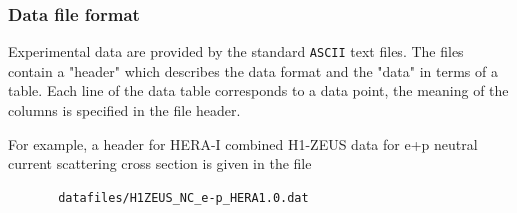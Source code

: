 \subsubsection{Data file format}
\label{sec:dataformat}
   Experimental data are provided by the standard {\tt ASCII} text files. The files
   contain a "header" which describes the data format and the "data" in terms
   of a  table. Each line of the data table corresponds to a
   data point, the meaning of the columns is specified in the file header.

   For example, a header for HERA-I combined H1-ZEUS data for e+p neutral 
   current scattering cross section is given in the file

\begin{verbatim}
       datafiles/H1ZEUS_NC_e-p_HERA1.0.dat
\end{verbatim}

